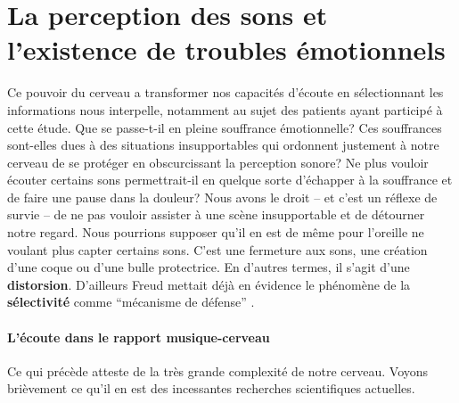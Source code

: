 \section{La perception des sons et l'existence de troubles
  émotionnels}
Ce pouvoir du cerveau a transformer nos capacités d'écoute en sélectionnant les informations nous 
interpelle, notamment au sujet des  patients ayant participé à cette étude.
Que se passe-t-il en pleine
souffrance émotionnelle? Ces souffrances sont-elles dues à des situations
insupportables qui
ordonnent justement à notre cerveau de se protéger en obscurcissant la
perception sonore?  Ne plus vouloir écouter certains
sons permettrait-il en quelque sorte d'échapper à la souffrance et de faire une
pause dans la douleur? Nous avons le droit -- et c'est un réflexe de
survie -- de ne pas vouloir assister à une scène insupportable et de détourner
notre regard.  Nous pourrions supposer qu'il en est de même pour l'oreille ne voulant plus capter
certains sons. C'est une fermeture aux sons, une création d'une coque ou d'une bulle protectrice. En 
d'autres termes, il s'agit d'une \textbf{distorsion}.
D'ailleurs Freud mettait déjà en évidence le phénomène de la
\textbf{sélectivité } comme ``mécanisme de défense'' \autocite{ Freud}.













\paragraph{ L'écoute dans le rapport
  musique-cerveau}
Ce qui précède atteste de la très grande complexité de notre cerveau.
Voyons brièvement ce qu'il en est des incessantes recherches scientifiques actuelles.

